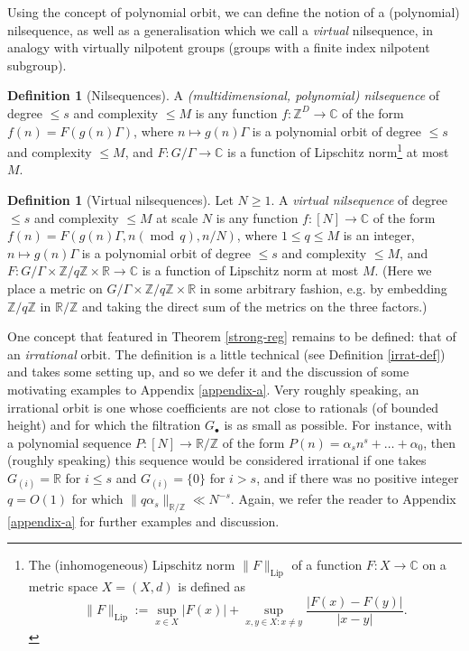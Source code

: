 \documentclass[11pt,reqno]{amsart}
\numberwithin{equation}{section}
\theoremstyle{plain}
\theoremstyle{definition}
\newtheorem{definition}[subsection]{Definition}
\renewcommand{\leq}{\leqslant}
\renewcommand{\geq}{\geqslant}
\newcommand{\md}[1]{\ensuremath{(\operatorname{mod}\, #1)}}
\newcommand\Z{\mathbb{Z}}
\newcommand\R{\mathbb{R}}
\newcommand\C{\mathbb{C}}
\newcommand\1{{\bf 1}}
\newcommand\2{{\bf 2}}
\begin{document}
Using the concept of polynomial orbit, we can define the notion of a (polynomial) nilsequence, as well as a generalisation which we call a \emph{virtual} nilsequence, in analogy with virtually nilpotent groups (groups with a finite index nilpotent subgroup).

\begin{definition}[Nilsequences]
A \emph{\textup{(}multidimensional, polynomial\textup{)} nilsequence} of degree $\leq s$ and complexity $\leq M$ is any function $f: \Z^D \to \C$ of the form $f(n) = F(g(n)\Gamma)$, where $n \mapsto g(n)\Gamma$ is a polynomial orbit of degree $\leq s$ and complexity $\leq M$, and $F: G/\Gamma \to \C$ is a function of Lipschitz norm\footnote{The (inhomogeneous) Lipschitz norm $\|F\|_{\operatorname{Lip}}$ of a function $F: X \to \C$ on a metric space $X = (X,d)$ is defined as
$$\|F\|_{\operatorname{Lip}} := \sup_{x \in X} |F(x)| + \sup_{x,y \in X: x \neq y} \frac{|F(x)-F(y)|}{|x-y|}.$$
} at most $M$.
\end{definition}

\begin{definition}[Virtual nilsequences]
Let $N \geq 1$.  A \emph{virtual nilsequence} of degree $\leq s$ and complexity $\leq M$ at scale $N$ is any function $f: [N] \to \C$ of the form $f(n) = F(g(n)\Gamma, n \md{q}, n/N)$, where $1 \leq q \leq M$ is an integer, $n \mapsto g(n)\Gamma$ is a polynomial orbit of degree $\leq s$ and complexity $\leq M$, and $F: G/\Gamma \times \Z/q\Z \times \R \to \C$ is a function of Lipschitz norm at most $M$.  (Here we place a metric on $G/\Gamma \times \Z/q\Z \times \R$ in some arbitrary fashion, e.g. by embedding $\Z/q\Z$ in $\R/\Z$ and taking the direct sum of the metrics on the three factors.)
\end{definition}

One concept that featured in Theorem \ref{strong-reg} remains to be defined: that of an \emph{irrational} orbit. The definition is a little technical (see Definition \ref{irrat-def}) and takes some setting up, and so we defer it and the discussion of some motivating examples to Appendix \ref{appendix-a}. Very roughly speaking, an irrational orbit is one whose coefficients are not close to rationals (of bounded height) and for which the filtration $G_{\bullet}$ is as small as possible.  For instance, with a polynomial sequence $P: [N] \to \R/\Z$ of the form $P(n) = \alpha_s n^s + \ldots + \alpha_0$, then (roughly speaking) this sequence would be considered irrational if one takes $G_{(i)} = \R$ for $i \leq s$ and $G_{(i)}=\{0\}$ for $i>s$, and if there was no positive integer $q=O(1)$ for which $\| q \alpha_s \|_{\R/\Z} \ll N^{-s}$.  Again, we refer the reader to Appendix \ref{appendix-a} for further examples and discussion.
\end{document}
